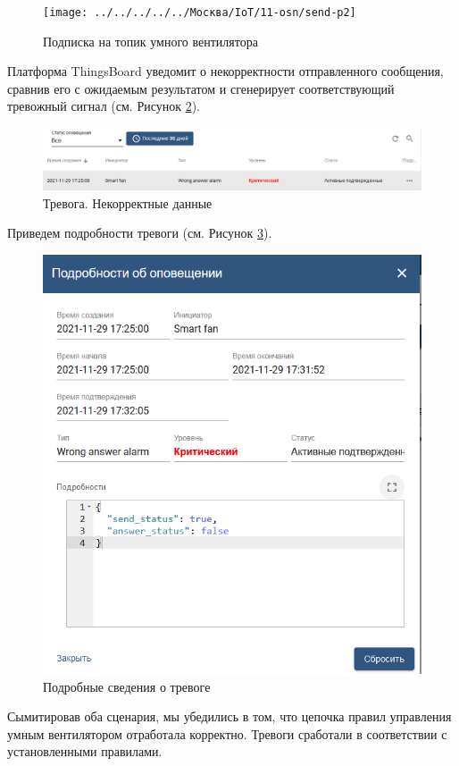 \documentclass[a4paper,14pt]{extarticle}
\begin{document}
\begin{figure}[h!]
	\centering
	\texttt{[image: ../../../../../Москва/IoT/11-osn/send-p2]}
	\caption{Подписка на топик умного вентилятора}
	\label{fig:send-p2}
\end{figure}


Платформа ThingsBoard уведомит о некорректности отправленного сообщения, сравнив его с ожидаемым результатом и сгенерирует соответствующий тревожный сигнал (см. Рисунок \ref{fig:alarm-wrong-response}).

\begin{figure}[h!]
	\centering
	\includegraphics[width=1\linewidth]{images/alarm-wrong-response}
	\caption{Тревога. Некорректные данные}
	\label{fig:alarm-wrong-response}
\end{figure}
\newpage
Приведем подробности тревоги (см. Рисунок \ref{fig:alarm-wrong-response-detail}).
\begin{figure}[h!]
	\centering
	\includegraphics[width=0.6\linewidth]{images/alarm-wrong-response-detail}
	\caption{Подробные сведения о тревоге}
	\label{fig:alarm-wrong-response-detail}
\end{figure}

Сымитировав оба сценария, мы убедились в том, что цепочка правил управления умным вентилятором отработала корректно. Тревоги сработали в соответствии с установленными правилами.
\end{document}
